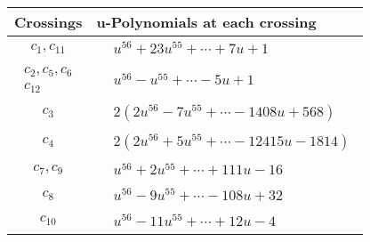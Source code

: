 \documentclass[1p]{elsarticle_modified}
\theoremstyle{definition}
\begin{document}
\begin{tabular}{m{50pt}|m{274pt}}
Crossings & \hspace{64pt}u-Polynomials at each crossing \\
\hline $$\begin{aligned}c_{1},c_{11}\end{aligned}$$&$\begin{aligned}
&u^{56}+23 u^{55}+\cdots+7 u+1
\end{aligned}$\\
\hline $$\begin{aligned}c_{2},c_{5},c_{6}\\c_{12}\end{aligned}$$&$\begin{aligned}
&u^{56}- u^{55}+\cdots-5 u+1
\end{aligned}$\\
\hline $$\begin{aligned}c_{3}\end{aligned}$$&$\begin{aligned}
&2(2 u^{56}-7 u^{55}+\cdots-1408 u+568)
\end{aligned}$\\
\hline $$\begin{aligned}c_{4}\end{aligned}$$&$\begin{aligned}
&2(2 u^{56}+5 u^{55}+\cdots-12415 u-1814)
\end{aligned}$\\
\hline $$\begin{aligned}c_{7},c_{9}\end{aligned}$$&$\begin{aligned}
&u^{56}+2 u^{55}+\cdots+111 u-16
\end{aligned}$\\
\hline $$\begin{aligned}c_{8}\end{aligned}$$&$\begin{aligned}
&u^{56}-9 u^{55}+\cdots-108 u+32
\end{aligned}$\\
\hline $$\begin{aligned}c_{10}\end{aligned}$$&$\begin{aligned}
&u^{56}-11 u^{55}+\cdots+12 u-4
\end{aligned}$\\
\hline
\end{tabular}\\~\\
\end{document}
